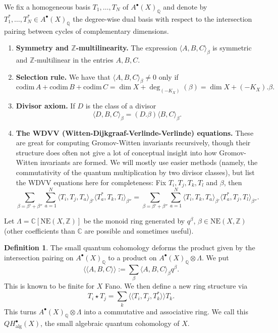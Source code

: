 \documentclass[11pt]{amsart}
\theoremstyle{plain}
\numberwithin{equation}{section}
\theoremstyle{definition}
\newtheorem{definition}[theorem]{Definition}
\theoremstyle{remark}
\newcommand{\Z}{\mathbb Z}
\begin{document}
We fix a homogeneous basis $T_1, \dots , T_N$ of $A^{\bullet}(X)_{\mathbb{Q}}$ and denote by $T_1^* , \dots , T_N^* \in A^{\bullet}(X)_{\mathbb{Q}}$ the degree-wise dual basis with respect to the intersection pairing between cycles of complementary dimensions. 

\begin{enumerate}
\item
\textbf{Symmetry and $\mathbb{Z}$-multilinearity.}
The expression $\langle A, B, C\rangle_{\beta}$ is symmetric and $\mathbb{Z}$-multilinear in the entries $A, B, C$.
\item 
\textbf{Selection rule.} We have that $\langle A, B, C\rangle_{\beta}\neq 0$ only if 
\[
\mathrm{codim}\, A + \mathrm{codim}\, B + \mathrm{codim}\, C = \dim X + \deg_{(-K_X)} (\beta ) = \dim X + (-K_X).\beta .
\]
\item 
\textbf{Divisor axiom.} If $D$ is the class of a divisor
\[
\langle D , B, C\rangle_{\beta} = (D.\beta) \langle B, C\rangle_{\beta}. 
\]
\item \textbf{The WDVV (Witten-Dijkgraaf-Verlinde-Verlinde) equations.} These are great for computing Gromov-Witten invariants recursively, though their structure does often not give a lot of conceptual insight into how Gromov-Witten invariants are formed. We will mostly use easier methods (namely, the commutativity of the quantum multiplication by two divisor classes), but list the WDVV equations here for completeness: Fix $T_i, T_j, T_k, T_l$ and $\beta$, then 
\[
\sum_{\beta = \beta' + \beta''}  \sum_{a=1}^N \langle T_i, T_j, T_a \rangle_{\beta'} \langle T_a^*, T_k, T_l \rangle_{\beta''} = \sum_{\beta = \beta' + \beta''}  \sum_{a=1}^N \langle T_i, T_k, T_a \rangle_{\beta'} \langle T_a^*, T_j, T_l \rangle_{\beta''} .
\]
\end{enumerate}

Let $\Lambda = \mathbb{C} [ \mathrm{NE}(X, \Z)]$ be the monoid ring generated by $q^{\beta}$, $\beta \in \mathrm{NE}(X, \Z)$ (other coefficients than $\mathbb{C}$ are possible and sometimes useful). 

\begin{definition}\label{dSmallQuantumCohomology}
The small quantum cohomology deforms the product given by the intersection pairing on $A^{\bullet}(X)_{\mathbb{Q}}$ to a product on $A^{\bullet}(X)_{\mathbb{Q}}\otimes \Lambda$. We put
\[
\langle\langle A,B,C \rangle\rangle := \sum_{\beta} \langle A, B, C \rangle_{\beta} q^{\beta}. 
\]
This is known to be finite for $X$ Fano. We then define a new ring structure via
\[
T_i \star T_j = \sum_{k} \langle\langle T_i, T_j, T_k^*  \rangle\rangle T_k .
\]
This turns $A^{\bullet}(X)_{\mathbb{Q}}\otimes \Lambda$ into a commutative and associative ring. We call this $QH^{\bullet}_{\mathrm{alg}} (X)$, the small algebraic quantum cohomology of $X$. 
\end{definition}
\end{document}
